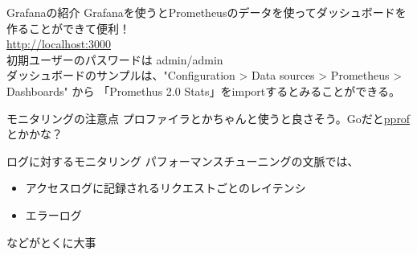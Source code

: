 \documentclass{beamer}
\begin{document}
\begin{frame}{Grafanaの紹介}
  Grafanaを使うとPrometheusのデータを使ってダッシュボードを作ることができて便利！\\
  \href{http://localhost:3000}{http://localhost:3000} \\
  初期ユーザーのパスワードは admin/admin\\
  ダッシュボードのサンプルは、"Configuration > Data sources > Prometheus > Dashboards" から 「Promethus 2.0 Stats」をimportするとみることができる。
\end{frame}

\begin{frame}{モニタリングの注意点}
  プロファイラとかちゃんと使うと良さそう。Goだと\href{https://pkg.go.dev/net/http/pprof}{pprof}とかかな？
\end{frame}

\begin{frame}{ログに対するモニタリング}
  パフォーマンスチューニングの文脈では、
  \begin{itemize}
    \item アクセスログに記録されるリクエストごとのレイテンシ
    \item エラーログ
  \end{itemize}
  などがとくに大事
\end{frame}
\end{document}
